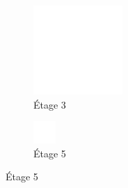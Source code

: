 \begin{figure}[h]
\begin{subfigure}{.3\textwidth}
        \includegraphics[width=\textwidth]{contenu/resources/images/gauss_3}
        \caption{Étage 3}
    \end{subfigure}
    \hfill
    \begin{subfigure}{.3\textwidth}
        \centering
        \includegraphics[width=\textwidth]{contenu/resources/images/gauss_5}
        \caption{Étage 5}
    \end{subfigure}


\end{figure}

